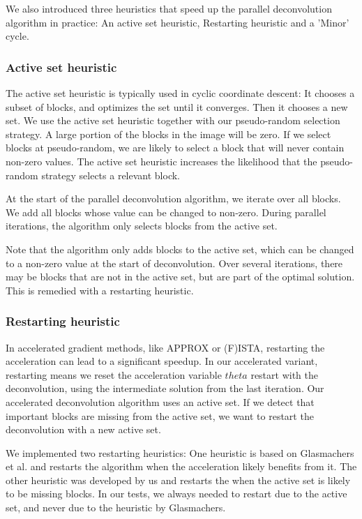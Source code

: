 We also introduced three heuristics that speed up the parallel deconvolution algorithm in practice: An active set heuristic, Restarting heuristic and a 'Minor' cycle.


\subsubsection{Active set heuristic}
The active set heuristic is typically used in cyclic coordinate descent: It chooses a subset of blocks, and optimizes the set until it converges. Then it chooses a  new set. We use the active set heuristic together with our pseudo-random selection strategy. A large portion of the blocks in the image will be zero. If we select blocks at pseudo-random, we are likely to select a block that will never contain non-zero values. The active set heuristic increases the likelihood that the pseudo-random strategy selects a relevant block. 

At the start of the parallel deconvolution algorithm, we iterate over all blocks. We add all blocks whose value can be changed to non-zero. During parallel iterations, the algorithm only selects blocks from the active set.

Note that the algorithm only adds blocks to the active set, which can be changed to a non-zero value at the start of deconvolution. Over several iterations, there may be blocks that are not in the active set, but are part of the optimal solution. This is remedied with a restarting heuristic.


\subsubsection{Restarting heuristic}
In accelerated gradient methods, like APPROX or (F)ISTA, restarting the acceleration can lead to a significant speedup\cite{fercoq2016restarting}. In our accelerated variant, restarting means we reset the acceleration variable $theta$ restart with the deconvolution, using the intermediate solution from the last iteration. Our accelerated deconvolution algorithm uses an active set. If we detect that important blocks are missing from the active set, we want to restart the deconvolution with a new active set. 

We implemented two restarting heuristics: One heuristic is based on Glasmachers et al.\cite{glasmachers2014coordinate} and restarts the algorithm when the acceleration likely benefits from it. The other heuristic was developed by us and restarts the when the active set is likely to be missing blocks. In our tests, we always needed to restart due to the active set, and never due to the heuristic by Glasmachers.

